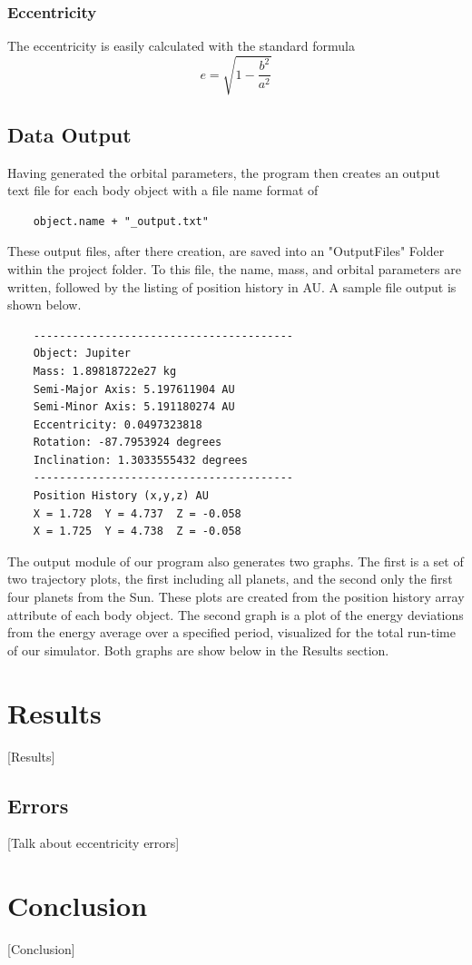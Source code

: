 \documentclass[a4paper,12pt]{article} %
\numberwithin{equation}{section} %
\numberwithin{figure}{section} %
\begin{document}
\subsubsection{Eccentricity}

The eccentricity is easily calculated with the standard formula $$e=\sqrt{1-\frac{b^2}{a^2}}$$

\subsection{Data Output}
Having generated the orbital parameters, the program then creates an output text file for each body object with a file name format of 

\begin{verbatim}
    object.name + "_output.txt"
\end{verbatim}

These output files, after there creation, are saved into an "OutputFiles" Folder within the project folder. To this file, the name, mass, and orbital parameters are written, followed by the listing of position history in AU. A sample file output is shown below.

\begin{verbatim}
    ----------------------------------------
    Object: Jupiter
    Mass: 1.89818722e27 kg
    Semi-Major Axis: 5.197611904 AU
    Semi-Minor Axis: 5.191180274 AU
    Eccentricity: 0.0497323818
    Rotation: -87.7953924 degrees
    Inclination: 1.3033555432 degrees
    ----------------------------------------
    Position History (x,y,z) AU
    X = 1.728  Y = 4.737  Z = -0.058
    X = 1.725  Y = 4.738  Z = -0.058
\end{verbatim}

The output module of our program also generates two graphs. The first is a set of two trajectory plots, the first including all planets, and the second only the first four planets from the Sun. These plots are created from the position history array attribute of each body object. The second graph is a plot of the energy deviations from the energy average over a specified period, visualized for the total run-time of our simulator. Both graphs are show below in the Results section.

\section{Results}

[Results]

\subsection{Errors}

[Talk about eccentricity errors]

\section{Conclusion}

[Conclusion]



\end{document}
